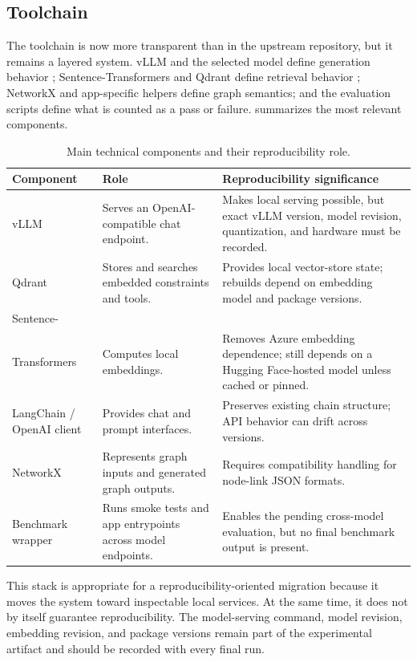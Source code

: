\documentclass[11pt,a4paper]{article}
\begin{document}
\subsection{Toolchain}

The toolchain is now more transparent than in the upstream repository, but it remains a layered system. vLLM and the selected model define generation behavior \cite{kwon2023vllm,vllmdocs}; Sentence-Transformers and Qdrant define retrieval behavior \cite{reimers2019sentencebert,qdrantdocs}; NetworkX and app-specific helpers define graph semantics; and the evaluation scripts define what is counted as a pass or failure.  summarizes the most relevant components.

\begin{table}[htbp]
  \centering
  \caption{Main technical components and their reproducibility role.}
  \label{tab:tools}
  \begin{tabularx}{\textwidth}{L{3.0cm}Y Y}
    \toprule
    Component & Role & Reproducibility significance \\
    \midrule
    vLLM & Serves an OpenAI-compatible chat endpoint. & Makes local serving possible, but exact vLLM version, model revision, quantization, and hardware must be recorded. \\
    Qdrant & Stores and searches embedded constraints and tools. & Provides local vector-store state; rebuilds depend on embedding model and package versions. \\
    Sentence-\\Transformers & Computes local embeddings. & Removes Azure embedding dependence; still depends on a Hugging Face-hosted model unless cached or pinned. \\
    LangChain / OpenAI client & Provides chat and prompt interfaces. & Preserves existing chain structure; API behavior can drift across versions. \\
    NetworkX & Represents graph inputs and generated graph outputs. & Requires compatibility handling for node-link JSON formats. \\
    Benchmark wrapper & Runs smoke tests and app entrypoints across model endpoints. & Enables the pending cross-model evaluation, but no final benchmark output is present. \\
    \bottomrule
  \end{tabularx}
\end{table}

This stack is appropriate for a reproducibility-oriented migration because it moves the system toward inspectable local services. At the same time, it does not by itself guarantee reproducibility. The model-serving command, model revision, embedding revision, and package versions remain part of the experimental artifact and should be recorded with every final run.
\end{document}
